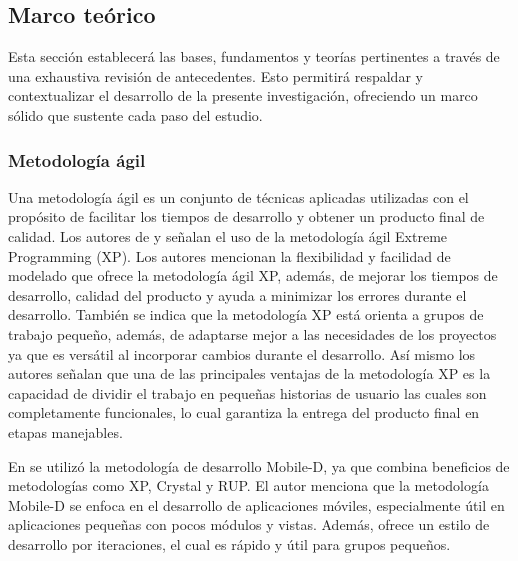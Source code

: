 \subsection{Marco teórico}
Esta sección establecerá las bases, fundamentos y teorías pertinentes a través de una exhaustiva revisión de
antecedentes. Esto permitirá respaldar y contextualizar el desarrollo de la presente investigación, ofreciendo
un marco sólido que sustente cada paso del estudio.

\subsubsection{Metodología ágil}
Una metodología ágil es un conjunto de técnicas aplicadas utilizadas con el propósito de facilitar los tiempos de
desarrollo y obtener un producto final de calidad. Los autores de \cite{lesanoperezAplicativoMovilGeoubicacion2022} y
\cite{chicaizavillegasAplicacionWebPara2023}
señalan el uso de la
metodología ágil Extreme Programming (XP). Los autores
mencionan la flexibilidad y facilidad de modelado que ofrece la metodología ágil XP, además, de mejorar los tiempos
de desarrollo, calidad del producto y ayuda a minimizar los errores durante el desarrollo. También
se indica que la metodología XP está orienta a grupos de
trabajo pequeño, además, de adaptarse mejor a las necesidades de los proyectos ya que es versátil al incorporar
cambios durante el desarrollo. Así mismo los autores señalan que una de las
principales ventajas de la metodología XP es la capacidad de dividir el trabajo en pequeñas historias de usuario
las cuales son completamente funcionales, lo cual garantiza la entrega
del producto final en etapas manejables.

\bigbreak
En \cite{chasichangoAplicacionMovilApoyo2022} se utilizó la metodología de desarrollo Mobile-D, ya que combina
beneficios de metodologías como XP, Crystal y RUP. El autor menciona que la metodología Mobile-D se enfoca en el
desarrollo de aplicaciones móviles, especialmente útil en aplicaciones pequeñas con pocos módulos y vistas. Además,
ofrece un estilo de desarrollo por iteraciones, el cual es rápido y útil para grupos pequeños.

